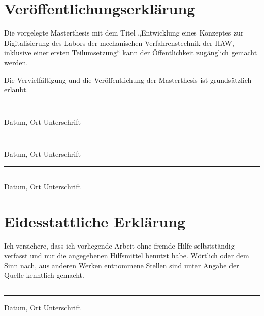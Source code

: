 \section*{Veröffentlichungserklärung}

\manualmark {} 

Die vorgelegte Masterthesis mit dem Titel „Entwicklung eines Konzeptes zur Digitalisierung des Labors der
mechanischen Verfahrenstechnik der HAW, inklusive einer ersten
Teilumsetzung“ kann der Öffentlichkeit zugänglich gemacht werden.

Die Vervielfältigung und die Veröffentlichung der Masterthesis  ist grundsätzlich erlaubt.






\vspace{50pt}
\noindent\rule{5cm}{.4pt}\hfill\rule{5cm}{.4pt}\par
\noindent Datum, Ort \hfill Unterschrift

\vspace{30pt}
\noindent\rule{5cm}{.4pt}\hfill\rule{5cm}{.4pt}\par
\noindent Datum, Ort \hfill Unterschrift

\vspace{30pt}
\noindent\rule{5cm}{.4pt}\hfill\rule{5cm}{.4pt}\par
\noindent Datum, Ort \hfill Unterschrift

\vspace{30pt}




\section*{Eidesstattliche Erklärung}

Ich versichere, dass ich vorliegende Arbeit ohne fremde Hilfe selbstständig verfasst und nur die angegebenen Hilfsmittel benutzt habe. Wörtlich oder dem Sinn nach, aus anderen Werken entnommene Stellen sind unter Angabe der Quelle kenntlich gemacht. 




\vspace{50pt}
\noindent\rule{5cm}{.4pt}\hfill\rule{5cm}{.4pt}\par
\noindent Datum, Ort \hfill Unterschrift